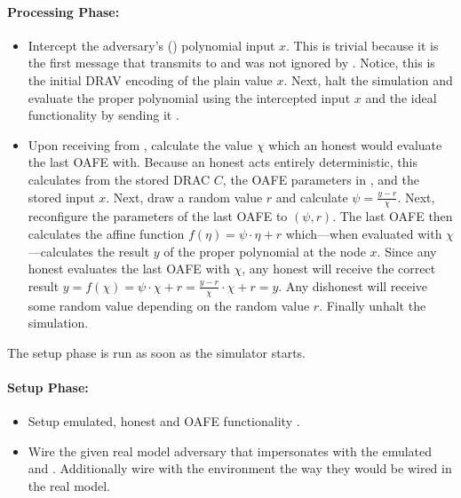\paragraph{Processing Phase:}

\begin{itemize}

  \item Intercept the adversary's (\JWadv{}) polynomial input $x$. This is
    trivial because it is the first message that \JWadv{} transmits to
    \JWfuncSymOAFE{} and was not ignored by \JWfuncSymOAFE{}. Notice, this is
    the initial DRAV encoding of the plain value $x$. Next, halt the simulation
    and evaluate the proper polynomial using the intercepted input $x$ and the
    ideal functionality \JWfuncSymOPEnp{} by sending it .

  \item Upon receiving  from \JWfuncSymOPEnp{},
    calculate the value $\chi$ which an honest \JWpTwo{} would evaluate the last
    OAFE with. Because an honest \JWpTwo{} acts entirely deterministic, this
    calculates from the stored DRAC $C$, the OAFE parameters in \JWfuncSymOAFE,
    and the stored input $x$. Next, draw a random value $r$ and calculate $\psi
    = \frac{y-r}{\chi}$. Next, reconfigure the parameters of the last OAFE to
    $(\psi, r)$. The last OAFE then calculates the affine function $f(\eta) =
    \psi \cdot \eta + r$ which---when evaluated with $\chi$---calculates the
    result $y$ of the proper polynomial at the node $x$. Since any honest
    \JWpTwo{} evaluates the last OAFE with $\chi$, any honest \JWpTwo{} will
    receive the correct result $y = f(\chi) = \psi \cdot \chi + r =
    \frac{y-r}{\chi} \cdot \chi + r = y$. Any dishonest \JWpTwo{} will receive
    some random value depending on the random value $r$. Finally unhalt the
    simulation.

\end{itemize}


\label{sec:simulator-goliath}

The setup phase is run as soon as the simulator starts.

\paragraph{Setup Phase:}

\begin{itemize}

  \item Setup emulated, honest \JWpTwo{} and OAFE functionality
    \JWfuncSymOAFE{}.

  \item Wire the given real model adversary \JWadv{} that impersonates \JWpOne{}
    with the emulated \JWpTwo{} and \JWfuncSymOAFE{}. Additionally wire \JWadv{}
    with the environment the way they would be wired in the real model.

\end{itemize}

